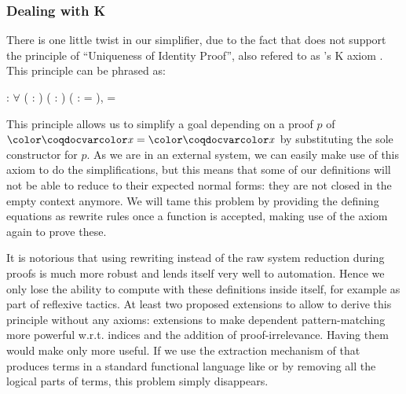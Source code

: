 

\subsubsection{Dealing with K}
\label{sec:dealing-with-k}

There is one little twist in our simplifier, due to the fact that \Coq does
not support the principle of ``Uniqueness of Identity Proof'', also
refered to as 's K axiom \cite{Streicher91}. This
principle can be phrased as:

: \ensuremath{\forall} ( : ) (
: ) ( :  =
),  = 

This principle allows us to simplify a goal depending on a proof $p$ of
$\var{x} = \var{x}$ by substituting the sole constructor  for
$p$. As we are in an external system, we can easily make use of this
axiom to do the simplifications, but this means that some of our
definitions will not be able to reduce to their expected normal forms: 
they are not closed in the empty context anymore. We will tame this
problem by providing the defining equations as rewrite rules
once a function is accepted, making use of the axiom again to prove
these. 

It is notorious that using rewriting instead of the raw system reduction
during proofs is much more robust and lends itself very well to
automation. Hence we only lose the ability to compute with these
definitions inside \Coq itself, for example as part of reflexive
tactics. At least two proposed extensions to \Coq allow to derive this
principle without any axioms: extensions to make dependent
pattern-matching more powerful w.r.t. indices \cite{conf/types/BarrasCGHS08} and 
the addition of proof-irrelevance. Having them would make \Equations
only more useful.
If we use the extraction mechanism of \Coq \cite{Let2008} that produces
terms in a standard functional language like \ML or \Haskell by removing
all the logical parts of terms, this problem simply disappears.


